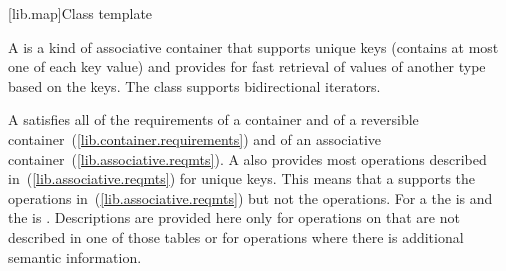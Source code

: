 [lib.map]{Class template }

%
\pnum
A  is a kind of associative container that
supports unique keys (contains at most one of each key value) and
provides for fast retrieval of values of another type  based
on the keys. The  class supports bidirectional iterators.

\pnum
A
satisfies all of the requirements of a container and of a reversible container~(\ref{lib.container.requirements}) and of
an associative container~(\ref{lib.associative.reqmts}).
A
also provides most operations described in~(\ref{lib.associative.reqmts})
for unique keys.
This means that a
supports the
operations in~(\ref{lib.associative.reqmts})
but not the
operations.
For a
the
is
and the
is
.
Descriptions are provided here only for operations on
that are not described in one of those tables
or for operations where there is additional semantic information.

